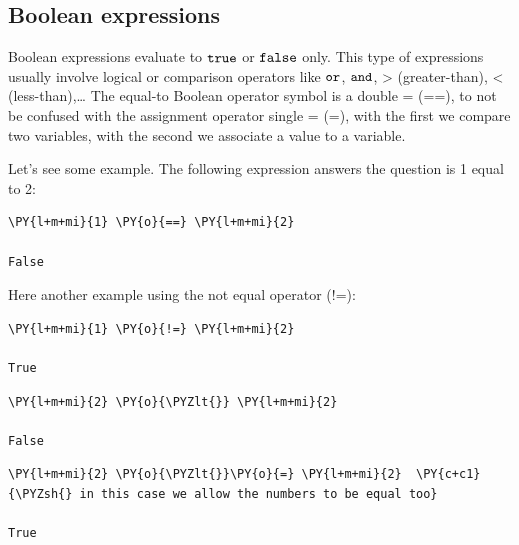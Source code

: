 \subsection{Boolean expressions}\label{boolean-expressions}

Boolean expressions evaluate to \(\tt{true}\) or \(\tt{false}\) only. This type
of expressions usually involve logical or comparison operators like \(\tt{or}\), \(\tt{and}\), \textgreater{} (greater-than), \textless{} (less-than),\ldots{}
The equal-to Boolean operator symbol is a double = (==), to not be confused with the assignment operator single = (=), with the first we compare two variables, with the second we associate a value to a variable.

Let's see some example. The following expression answers the question is 1 equal to 2:

\begin{tcolorbox}[breakable, size=fbox, boxrule=1pt, pad at break*=1mm, colback=cellbackground, colframe=cellborder]
\begin{Verbatim}[commandchars=\\\{\}]
\PY{l+m+mi}{1} \PY{o}{==} \PY{l+m+mi}{2} 

False
\end{Verbatim}
\end{tcolorbox}

Here another example using the not equal operator (!=):

\begin{tcolorbox}[breakable, size=fbox, boxrule=1pt, pad at break*=1mm, colback=cellbackground, colframe=cellborder]
\begin{Verbatim}[commandchars=\\\{\}]
\PY{l+m+mi}{1} \PY{o}{!=} \PY{l+m+mi}{2}
  
True
\end{Verbatim}
\end{tcolorbox}

\begin{tcolorbox}[breakable, size=fbox, boxrule=1pt, pad at break*=1mm, colback=cellbackground, colframe=cellborder]
\begin{Verbatim}[commandchars=\\\{\}]
\PY{l+m+mi}{2} \PY{o}{\PYZlt{}} \PY{l+m+mi}{2}

False
\end{Verbatim}
\end{tcolorbox}

\begin{tcolorbox}[breakable, size=fbox, boxrule=1pt, pad at break*=1mm, colback=cellbackground, colframe=cellborder]
\begin{Verbatim}[commandchars=\\\{\}]
\PY{l+m+mi}{2} \PY{o}{\PYZlt{}}\PY{o}{=} \PY{l+m+mi}{2}  \PY{c+c1}{\PYZsh{} in this case we allow the numbers to be equal too}

True
\end{Verbatim}
\end{tcolorbox}

